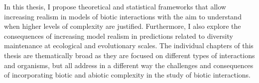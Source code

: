 \begin{refsection}

In this thesis, I propose theoretical and statistical frameworks that allow increasing realism in models of biotic interactions with the aim to understand when higher levels of complexity are justified. Furthermore, I also explore the consequences of increasing model realism in predictions related to diversity maintenance at ecological and evolutionary scales. The individual chapters of this thesis are thematically broad as they are focused on different types of interactions and organisms, but all address in a different way the challenges and consequences of incorporating biotic and abiotic complexity in the study of biotic interactions.


\printbibliography
\end{refsection}

